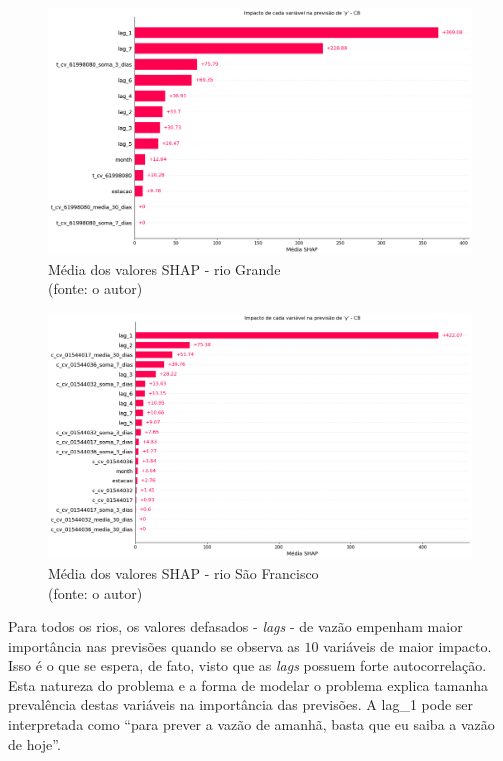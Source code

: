\begin{figure}[!h]
\centering
\includegraphics[scale=0.33]{Figuras/rio_grande/wfv/feature_importance/feature_importance_cb.png}
\caption{Média dos valores SHAP - rio Grande\\(fonte: o autor)}
\label{fig:grande_feature_importance_cb}
\end{figure}

\begin{figure}[!h]
\centering
\includegraphics[scale=0.33]{Figuras/rio_sao_francisco/wfv/feature_importance/feature_importance_cb.png}
\caption{Média dos valores SHAP - rio São Francisco\\(fonte: o autor)}
\label{fig:francisco_feature_importance_cb}
\end{figure}
\clearpage

Para todos os rios, os valores defasados - \textit{lags} - de vazão empenham maior importância nas previsões quando se observa as $10$ variáveis de maior impacto. Isso é o que se espera, de fato, visto que as \textit{lags} possuem forte autocorrelação. Esta natureza do problema e a forma de modelar o problema explica tamanha prevalência destas variáveis na importância das previsões. A lag\_1 pode ser interpretada como ``para prever a vazão de amanhã, basta que eu saiba a vazão de hoje''.

